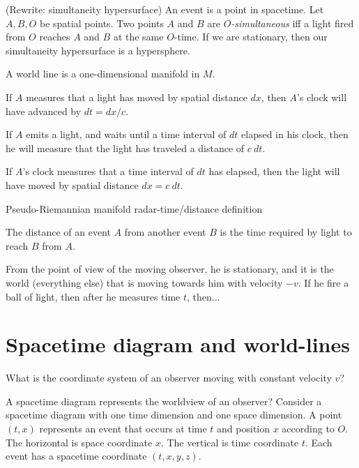 (Rewrite: simultaneity hypersurface)
An event is a point in spacetime.
Let \(A,B,O\) be spatial points.
Two points \(A\) and \(B\) are \emph{\(O\)-simultaneous} iff a light fired from \(O\) reaches \(A\) and \(B\) at the same \(O\)-time.
If we are stationary, then our simultaneity hypersurface is a hypersphere.

A world line is a one-dimensional manifold in \(M\).

If \(A\) measures that a light has moved by spatial distance \(dx\), then \(A\)'s clock will have advanced by \(dt = dx / c\).

If \(A\) emits a light, and waits until a time interval of \(dt\) elapsed in his clock, then he will measure that the light has traveled a distance of \(c~dt\).

If \(A\)'s clock measures that a time interval of \(dt\) has elapsed, then the light will have moved by spatial distance \(dx = c ~ dt\).

Pseudo-Riemannian manifold
radar-time/distance definition

The distance of an event \(A\) from another event \(B\) is the time required by light to reach \(B\) from \(A\).

From the point of view of the moving observer, he is stationary, and it is the world (everything else) that is moving towards him with velocity \(-v\). If he fire a ball of light, then after he measures time \(t\), then...



\section{Spacetime diagram and world-lines}

What is the coordinate system of an observer moving with constant velocity \(v\)?

A spacetime diagram represents the worldview of an observer?
Consider a spacetime diagram with one time dimension and one space dimension.
A point \((t,x)\) represents an event that occurs at time \(t\) and position \(x\) according to \(O\).
The horizontal is space coordinate \(x\).
The vertical is time coordinate \(t\).
Each event has a spacetime coordinate \((t,x,y,z)\).

